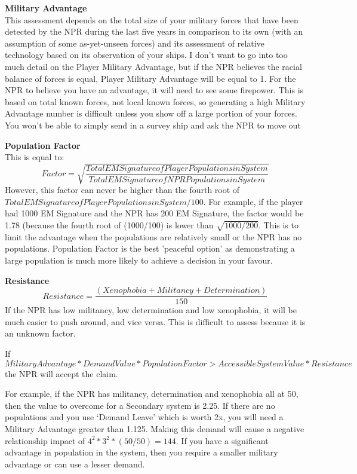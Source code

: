 \documentclass[../../Aurora C# unofficial manual.tex]{subfiles}
\begin{document}
	\textbf{Military Advantage}\\
	This assessment depends on the total size of your military forces that have been detected by the NPR during the last five years in comparison to its own (with an assumption of some as-yet-unseen forces) and its assessment of relative technology based on its observation of your ships. I don't want to go into too much detail on the Player Military Advantage, but if the NPR believes the racial balance of forces is equal, Player Military Advantage will be equal to 1. For the NPR to believe you have an advantage, it will need to see some firepower. This is based on total known forces, not local known forces, so generating a high Military Advantage number is difficult unless you show off a large portion of your forces. You won't be able to simply send in a survey ship and ask the NPR to move out
	
	\textbf{Population Factor}\\
	This is equal to:
	\[ Factor = \sqrt{\frac{Total EM Signature of Player Populations in System}{Total EM Signature of NPR Populations in System}} \]
	However, this factor can never be higher than the fourth root of \( Total EM Signature of Player Populations in System / 100 \). For example, if the player had 1000 EM Signature and the NPR has 200 EM Signature, the factor would be 1.78 (because the fourth root of (1000/100) is lower than \( \sqrt{1000 / 200} \). This is to limit the advantage when the populations are relatively small or the NPR has no populations. Population Factor is the best ’peaceful option’ as demonstrating a large population is much more likely to achieve a decision in your favour.
	
	\textbf{Resistance}\\
	\[ Resistance = \frac{(Xenophobia + Militancy + Determination)}{150} \]
	If the NPR has low militancy, low determination and low xenophobia, it will be much easier to push around, and vice versa. This is difficult to assess because it is an unknown factor.
	
	If
	\[ Military Advantage * Demand Value * Population Factor > Accessible System Value * Resistance \]
	the NPR will accept the claim.
	
	For example, if the NPR has militancy, determination and xenophobia all at 50, then the value to overcome for a Secondary system is 2.25. If there are no populations and you use ‘Demand Leave’ which is worth 2x, you will need a Military Advantage greater than 1.125. Making this demand will cause a negative relationship impact of \( 4^{2} * 3^{2} * (50/50) = 144 \). If you have a significant advantage in population in the system, then you require a smaller military advantage or can use a lesser demand.
	
\end{document}
